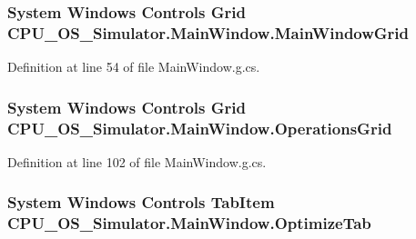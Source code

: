 \subsubsection[{Main\+Window\+Grid}]{\setlength{\rightskip}{0pt plus 5cm}System Windows Controls Grid C\+P\+U\+\_\+\+O\+S\+\_\+\+Simulator.\+Main\+Window.\+Main\+Window\+Grid\hspace{0.3cm}{\ttfamily [package]}}\label{class_c_p_u___o_s___simulator_1_1_main_window_a5c56d82a7b611446e81b7baa3229d76b}


Definition at line 54 of file Main\+Window.\+g.\+cs.

\hypertarget{class_c_p_u___o_s___simulator_1_1_main_window_ae4f2459995eb2f672c0fd3c2248b79fd}{}
\subsubsection[{Operations\+Grid}]{\setlength{\rightskip}{0pt plus 5cm}System Windows Controls Grid C\+P\+U\+\_\+\+O\+S\+\_\+\+Simulator.\+Main\+Window.\+Operations\+Grid\hspace{0.3cm}{\ttfamily [package]}}\label{class_c_p_u___o_s___simulator_1_1_main_window_ae4f2459995eb2f672c0fd3c2248b79fd}


Definition at line 102 of file Main\+Window.\+g.\+cs.

\hypertarget{class_c_p_u___o_s___simulator_1_1_main_window_a47b1359d9e96abf2b0935eb3392405d4}{}
\subsubsection[{Optimize\+Tab}]{\setlength{\rightskip}{0pt plus 5cm}System Windows Controls Tab\+Item C\+P\+U\+\_\+\+O\+S\+\_\+\+Simulator.\+Main\+Window.\+Optimize\+Tab\hspace{0.3cm}{\ttfamily [package]}}\label{class_c_p_u___o_s___simulator_1_1_main_window_a47b1359d9e96abf2b0935eb3392405d4}


